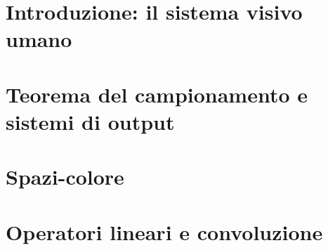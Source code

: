 \documentclass{article}
\begin{document}


\tableofcontents
\restoregeometry

\section{Introduzione: il sistema visivo umano}


\section{Teorema del campionamento e sistemi di output}


\section{Spazi-colore}


\section{Operatori lineari e convoluzione}

\end{document}
